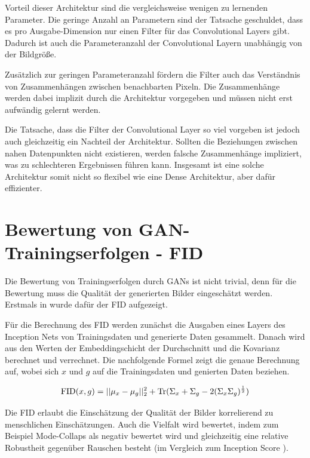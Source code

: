 Vorteil dieser Architektur sind die vergleichsweise wenigen zu lernenden Parameter.
Die geringe Anzahl an Parametern sind der Tatsache geschuldet, dass es pro Ausgabe-Dimension nur einen Filter für das Convolutional Layers gibt.
Dadurch ist auch die Parameteranzahl der Convolutional Layern unabhängig von der Bildgröße.

Zusätzlich zur geringen Parameteranzahl fördern die Filter auch das Verständnis von Zusammenhängen zwischen benachbarten Pixeln.
Die Zusammenhänge werden dabei implizit durch die Architektur vorgegeben und müssen nicht erst aufwändig gelernt werden.
\newline

Die Tatsache, dass die Filter der Convolutional Layer so viel vorgeben ist jedoch auch gleichzeitig ein Nachteil der Architektur.
Sollten die Beziehungen zwischen nahen Datenpunkten nicht existieren, werden falsche Zusammenhänge impliziert, was zu schlechteren Ergebnissen führen kann.
Insgesamt ist eine solche Architektur somit nicht so flexibel wie eine Dense Architektur, aber dafür effizienter.

\section{Bewertung von GAN-Trainingserfolgen - FID}
Die Bewertung von Trainingserfolgen durch GANs ist nicht trivial, denn für die Bewertung muss die Qualität der generierten Bilder eingeschätzt werden.
Erstmals in \cite{fid} wurde dafür der \acrfull{FID} aufgezeigt.

Für die Berechnung des \acrshort{FID} werden zunächst die Ausgaben eines Layers des Inception Nets von Trainingsdaten und generierte Daten gesammelt.
Danach wird aus den Werten der Embeddingschicht der Durchschnitt und die Kovarianz berechnet und verrechnet.
Die nachfolgende Formel \cite[S. 2]{are-gans-created-equally} zeigt die genaue Berechnung auf, wobei sich $x$ und $g$ auf die Trainingsdaten und genierten Daten beziehen.

\begin{equation}
	\operatorname{FID}(x, g) = ||\mu_x - \mu_g||_2^2 + \operatorname{Tr}(\Sigma_x + \Sigma_g - 2(\Sigma_x \Sigma_g)^{\frac{1}{2}})
\end{equation}

Die \acrshort{FID} erlaubt die Einschätzung der Qualität der Bilder korrelierend zu menschlichen Einschätzungen.
Auch die Vielfalt wird bewertet, indem zum Beispiel Mode-Collaps als negativ bewertet wird und gleichzeitig eine relative Robustheit gegenüber Rauschen besteht (im Vergleich zum Inception Score \cite{are-gans-created-equally}). 

